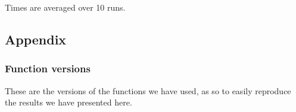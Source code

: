 \documentclass{article}
\begin{document}
\begin{table}[H]
{        Times are averaged over 10 runs.
    }
\end{table}






\appendix
\subsection{Appendix}

\subsubsection{Function versions}

These are the versions of the functions we have used, as so to easily reproduce the results we have presented here.
\end{document}
